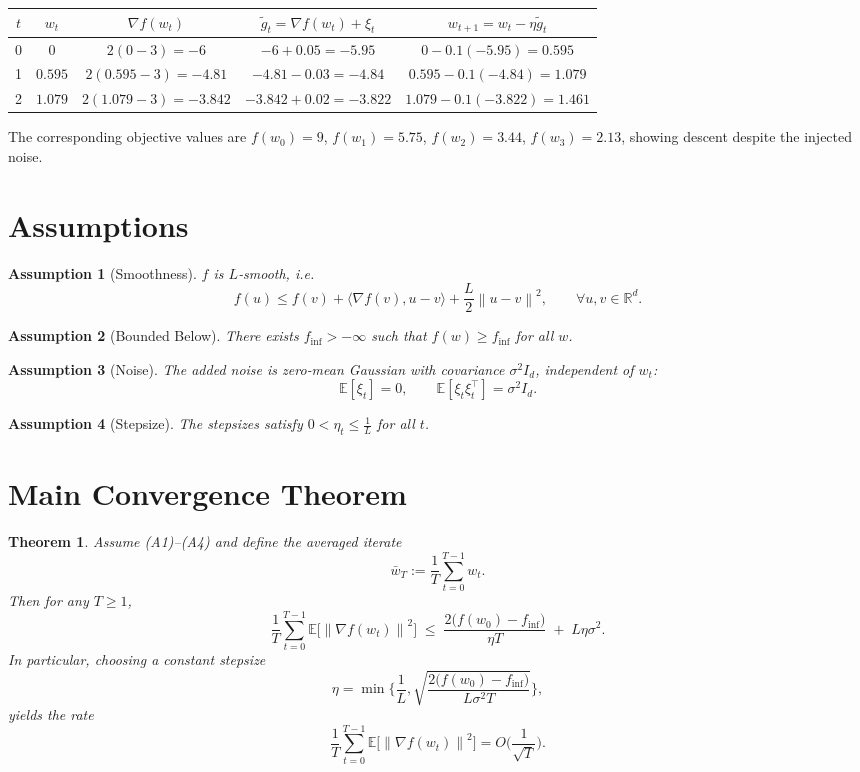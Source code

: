 \documentclass[11pt]{article}
\newtheorem{theorem}{Theorem}
\newtheorem{assumption}{Assumption}
\newcommand{\EE}{\mathbb{E}}
\newcommand{\RR}{\mathbb{R}}
\newcommand{\norm}[1]{\left\lVert #1 \right\rVert}
\begin{document}
\begin{center}
\begin{tabular}{c|c|c|c|c}
$t$ & $w_t$ & $\nabla f(w_t)$ & $\tilde g_t=\nabla f(w_t)+\xi_t$ & $w_{t+1}=w_t-\eta\tilde g_t$\\ \hline
0 & $0$ & $2(0-3)=-6$ & $-6+0.05=-5.95$ & $0-0.1(-5.95)=0.595$\\
1 & $0.595$ & $2(0.595-3)=-4.81$ & $-4.81-0.03=-4.84$ & $0.595-0.1(-4.84)=1.079$\\
2 & $1.079$ & $2(1.079-3)=-3.842$ & $-3.842+0.02=-3.822$ & $1.079-0.1(-3.822)=1.461$\\
\end{tabular}
\end{center}
The corresponding objective values are $f(w_0)=9$, $f(w_1)=5.75$,
$f(w_2)=3.44$, $f(w_3)=2.13$, showing descent despite the injected noise.

\newpage
\section*{Assumptions}
\begin{assumption}[Smoothness]
$f$ is $L$‑smooth, i.e.
\[
f(u)\le f(v)+\langle\nabla f(v),u-v\rangle
+\frac{L}{2}\norm{u-v}^{2},
\qquad\forall u,v\in\RR^{d}.
\tag{A1}
\]
\end{assumption}
\begin{assumption}[Bounded Below]
There exists $f_{\inf}>-\infty$ such that $f(w)\ge f_{\inf}$ for all $w$.
\end{assumption}
\begin{assumption}[Noise]
The added noise is zero‑mean Gaussian with covariance $\sigma^{2}I_d$,
independent of $w_t$:
\[
\EE[\xi_t]=0,\qquad
\EE[\xi_t\xi_t^{\top}]=\sigma^{2}I_d .
\tag{A3}
\]
\end{assumption}
\begin{assumption}[Stepsize]
The stepsizes satisfy $0<\eta_t\le \frac{1}{L}$ for all $t$.
\end{assumption}

\section*{Main Convergence Theorem}
\begin{theorem}
\label{thm:main}
Assume (A1)–(A4) and define the averaged iterate
\[
\bar w_T:=\frac{1}{T}\sum_{t=0}^{T-1}w_t .
\]
Then for any $T\ge1$,
\[
\frac{1}{T}\sum_{t=0}^{T-1}\EE\!\big[\norm{\nabla f(w_t)}^{2}\big]
\;\le\;
\frac{2\big(f(w_0)-f_{\inf}\big)}{\eta T}
\;+\;L\eta\sigma^{2} .
\tag{3}
\]
In particular, choosing a constant stepsize
\[
\eta = \min\Big\{\frac{1}{L},
\sqrt{\frac{2\big(f(w_0)-f_{\inf}\big)}{L\sigma^{2}T}}\Big\},
\]
yields the rate
\[
\frac{1}{T}\sum_{t=0}^{T-1}\EE\!\big[\norm{\nabla f(w_t)}^{2}\big]
= O\!\Big(\frac{1}{\sqrt{T}}\Big).
\tag{4}
\]
\end{theorem}
\end{document}
